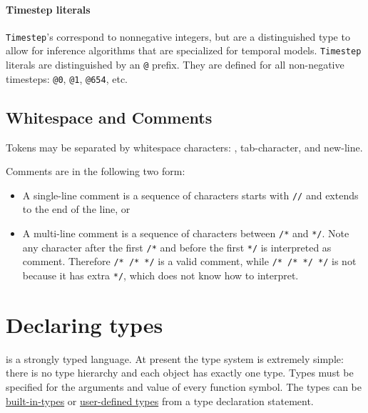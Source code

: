 \documentclass[12pt]{article}
\begin{document}
\paragraph{Timestep literals}
\verb|Timestep|'s correspond to nonnegative integers, but are a distinguished type
to allow for inference algorithms that are specialized for temporal models. 
\verb|Timestep| literals are distinguished by an \verb|@| prefix. They are defined for all non-negative timesteps: \verb|@0|, \verb|@1|, \verb|@654|, etc.

\subsection{Whitespace and Comments}
Tokens may be separated by whitespace characters: \textvisiblespace, tab-character, and new-line. 

Comments are in the following two form:
\begin{itemize}
\item A single-line comment is a sequence of characters starts with \verb|//| and extends to the end of the line, or
\item A multi-line comment is a sequence of characters between \verb|/*| and \verb|*/|. Note any character after the first \verb|/*| and before the first \verb|*/| is interpreted as comment. Therefore \verb|/* /* */| is a valid comment, while \verb|/* /* */ */| is not because it has extra \verb|*/|, which \bl does not know how to interpret.
\end{itemize}

\section{Declaring types}\label{type-declaration-section}
\bl is a strongly typed language. At present the type system is extremely simple: there is no type hierarchy
and each object has exactly one type. Types must be specified for the arguments and value of every function symbol.
The types can be \hyperref[builtin-type-section]{built-in-types} or \hyperref[user-type-section]{user-defined types} from a type declaration statement.
\end{document}
